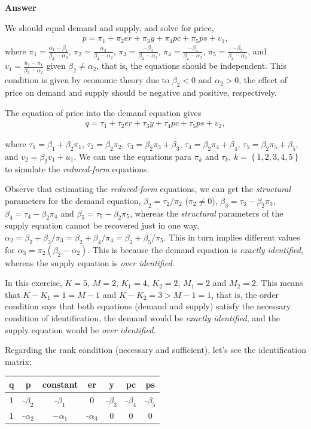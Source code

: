 \begin{enumerate}[leftmargin=*]
\textbf{Answer}

We should equal demand and supply, and solve for price,
\begin{align*}
	p=\pi_1+\pi_2 er + \pi_3 y + \pi_4 pc + \pi_5 ps + v_1,
\end{align*}
where $\pi_1=\frac{\alpha_1-\beta_1}{\beta_2-\alpha_2}$, $\pi_2=\frac{\alpha_3}{\beta_2-\alpha_2}$, $\pi_3=\frac{-\beta_3}{\beta_2-\alpha_2}$, $\pi_4=\frac{-\beta_4}{\beta_2-\alpha_2}$, $\pi_5=\frac{-\beta_5}{\beta_2-\alpha_2}$, and $v_1=\frac{u_2-u_1}{\beta_2-\alpha_2}$ given $\beta_2\neq\alpha_2$, that is, the equations should be independent. This condition is given by economic theory due to $\beta_2<0$ and $\alpha_2>0$, the effect of price on demand and supply should be negative and positive, respectively.

The equation of price into the demand equation gives
\begin{align*}
	q=\tau_1+\tau_2 er + \tau_3 y + \tau_4 pc + \tau_5 ps + v_2,
\end{align*}

where $\tau_1=\beta_1+\beta_2\pi_1$, $\tau_2=\beta_2\pi_2$, $\tau_3=\beta_2\pi_3+\beta_3$, $\tau_4=\beta_2\pi_4+\beta_4$, $\tau_5=\beta_2\pi_5+\beta_5$, and $v_2=\beta_2v_1+u_1$. We can use the equations para $\pi_k$ and $\tau_k$, $k=\left\{1,2,3,4,5\right\}$ to simulate the \textit{reduced-form} equations.

Observe that estimating the \textit{reduced-form} equations, we can get the \textit{structural} parameters for the demand equation, $\beta_2=\tau_2/\pi_2$ ($\pi_2\neq 0$), $\beta_3=\tau_3-\beta_2\pi_3$, $\beta_4=\tau_4-\beta_2\pi_4$ and $\beta_5=\tau_5-\beta_2\pi_5$, whereas the \textit{structural} parameters of the supply equation cannot be recovered just in one way, $\alpha_2=\beta_2+\beta_3/\pi_3=\beta_2+\beta_4/\pi_4=\beta_2+\beta_5/\pi_5$. This in turn implies different values for  $\alpha_3=\pi_2(\beta_2-\alpha_2)$. This is because the demand equation is \textit{exactly identified}, whereas the supply equation is \textit{over identified}. 

In this exercise, $K=5$, $M=2$, $K_1=4$, $K_2=2$, $M_1=2$ and $M_2=2$. This means that $K-K_1=1=M-1$ and $K-K_2=3>M-1=1$, that is, the order condition says that both equations (demand and supply) satisfy the necessary condition of identification, the demand would be \textit{exactly identified}, and the supply equation would be \textit{over identified}.

Regarding the rank condition (necessary and sufficient), let's see the identification matrix:
\begin{table}[!h]
	\label{tab:71}%
	\begin{tabular}{ccccccc}
		q    & p & constant & er & y & pc & ps \\
		\hline
		1 & -$\beta_2$ & -$\beta_1$ & 0 & -$\beta_3$ & -$\beta_4$ & -$\beta_5$\\
		1 & -$\alpha_2$ & $-\alpha_1$ & -$\alpha_3$ & 0 & 0 & 0 \\
	\end{tabular}
\end{table}


\end{enumerate}
